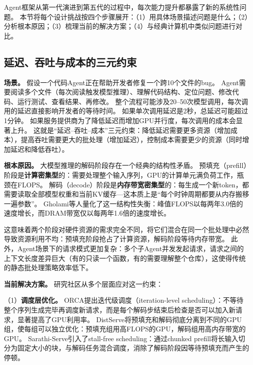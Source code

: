 Agent框架从第一代演进到第五代的过程中，每次能力提升都暴露了新的系统性问题。
本节将每个设计挑战按四个步骤展开：（1）用具体场景描述问题是什么；（2）分析根本原因；（3）梳理当前的解决方案；（4）与经典计算机中类似问题进行对比。

\subsection{延迟、吞吐与成本的三元约束}

\textbf{场景。}
假设一个代码Agent正在帮助开发者修复一个跨10个文件的bug。
Agent需要阅读多个文件（每次阅读触发模型推理）、理解代码结构、定位问题、修改代码、运行测试、查看结果、再修改。
整个流程可能涉及20--50次模型调用，每次调用的延迟直接影响开发者的等待时间。
如果单次调用延迟是2秒，总延迟可能超过1分钟。
如果服务提供商为了降低延迟而增加GPU并行度，每次调用的成本会显著上升。
这就是``延迟--吞吐--成本''三元约束：降低延迟需要更多资源（增加成本），提高吞吐需要更大的批处理（增加延迟），控制成本需要更少的资源（同时增加延迟和降低吞吐）。

\textbf{根本原因。}
大模型推理的解码阶段存在一个经典的结构性矛盾。
预填充（prefill）阶段是\textbf{计算密集型}的：需要处理整个输入序列，GPU的计算单元满负荷工作，瓶颈在FLOPS。
解码（decode）阶段是\textbf{内存带宽密集型}的：每生成一个新token，都需要读取全部模型权重和当前KV缓存---这本质上是``每个时钟周期都要从内存搬移一遍参数''\cite{gholami2024memorywall}。
Gholami等人量化了这一结构性失衡：峰值FLOPS以每两年3.0倍的速度增长，而DRAM带宽仅以每两年1.6倍的速度增长\cite{gholami2024memorywall}。

这意味着两个阶段对硬件资源的需求完全不同，将它们混合在同一个批处理中必然导致资源利用不均：预填充阶段抢占了计算资源，解码阶段等待内存带宽。
此外，Agent场景下的请求模式更加复杂：多个子Agent并发发起请求，请求之间的上下文长度差异巨大（有的只读一个函数，有的需要理解整个仓库），这使得传统的静态批处理策略效率低下。

\textbf{当前解决方案。}
研究社区从多个层面应对这一约束：

（1）\textbf{调度层优化。}
ORCA\cite{orca2022}提出迭代级调度（iteration-level scheduling）：不等待整个序列生成完毕再调度新请求，而是每个解码步结束后检查是否可以加入新请求，显著提高了GPU利用率。
DistServe\cite{zhong2024distserve}将预填充和解码彻底分离到不同的GPU组，使每组可以独立优化：预填充组用高FLOPS的GPU，解码组用高内存带宽的GPU。
Sarathi-Serve\cite{agrawal2024sarathi}引入了stall-free scheduling：通过chunked prefill将长输入切分为固定大小的块，与解码任务混合调度，消除了解码阶段因等待预填充而产生的停顿。

